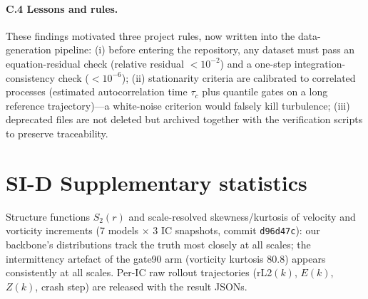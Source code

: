 \documentclass[11pt,a4paper]{article}
\begin{document}
\paragraph{C.4 Lessons and rules.} These findings motivated three project rules, now written into the data-generation pipeline: (i) before entering the repository, any dataset must pass an equation-residual check (relative residual $<10^{-2}$) and a one-step integration-consistency check ($<10^{-6}$); (ii) stationarity criteria are calibrated to correlated processes (estimated autocorrelation time $\tau_c$ plus quantile gates on a long reference trajectory)---a white-noise criterion would falsely kill turbulence; (iii) deprecated files are not deleted but archived together with the verification scripts to preserve traceability.

\section*{SI-D \quad Supplementary statistics}

Structure functions $S_2(r)$ and scale-resolved skewness/kurtosis of velocity and vorticity increments (7 models $\times$ 3 IC snapshots, commit \texttt{d96d47c}): our backbone's distributions track the truth most closely at all scales; the intermittency artefact of the gate90 arm (vorticity kurtosis $80.8$) appears consistently at all scales. Per-IC raw rollout trajectories (rL2$(k)$, $E(k)$, $Z(k)$, crash step) are released with the result JSONs.
\end{document}
